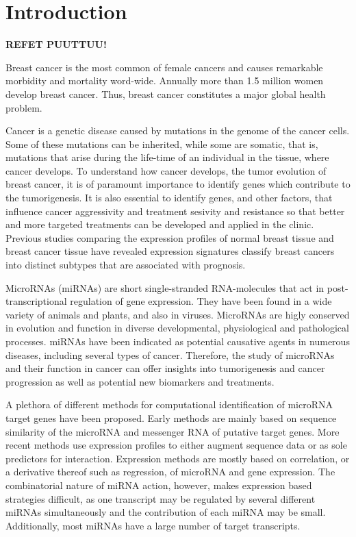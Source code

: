 
\section{Introduction}
\thispagestyle{empty}

\textbf{REFET PUUTTUU!}

Breast cancer is the most common of female cancers and causes remarkable
morbidity and mortality word-wide. Annually more than 1.5 million women
develop breast cancer. Thus, breast cancer constitutes a major global health
problem.

Cancer is a genetic disease caused by mutations in the genome of the cancer
cells. Some of these mutations can be inherited, while some are somatic, that
is, mutations that arise during the life-time of an individual in the tissue,
where cancer develops. To understand how cancer develops, the tumor evolution
of breast cancer, it is of paramount importance to identify genes which
contribute to the tumorigenesis. It is also essential to identify
genes, and other factors, that influence cancer aggressivity and
treatment sesivity and resistance so that better and more targeted
treatments can be developed and applied in the clinic.
Previous studies comparing the expression profiles of normal breast tissue
and breast cancer tissue have revealed expression signatures
classify breast cancers into distinct subtypes that are associated with prognosis.

MicroRNAs (miRNAs) are short single-stranded RNA-molecules that act in
post-transcriptional regulation of gene expression. They have been found in a
wide variety of animals and plants, and also in viruses. MicroRNAs are higly
conserved in evolution and function in diverse developmental, physiological
and pathological processes. miRNAs have been indicated as potential
causative agents in numerous diseases, including several types of cancer.
Therefore, the study of microRNAs and their function in cancer can offer
insights into tumorigenesis and cancer progression as well as potential new
biomarkers and treatments.

A plethora of different methods for computational identification of microRNA
target genes have been proposed. Early methods are mainly based on sequence
similarity of the microRNA and messenger RNA of putative target genes. More
recent methods use expression profiles to either augment sequence data or as
sole predictors for interaction. Expression methods are mostly based on
correlation, or a derivative thereof such as regression, of microRNA and gene
expression. The combinatorial nature of miRNA action, however, makes
expression based strategies difficult, as one transcript may be regulated by
several different miRNAs simultaneously and the contribution of each miRNA may
be small. Additionally, most miRNAs have a large number of target transcripts.

